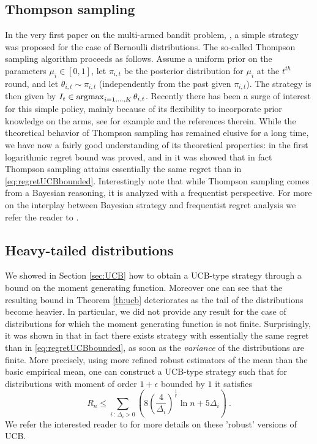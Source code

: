 \subsection{Thompson sampling}
In the very first paper on the multi-armed bandit problem, \cite{Tho33}, a simple strategy was proposed for the case of Bernoulli distributions. The so-called Thompson sampling algorithm proceeds as follows. Assume a uniform prior on the parameters $\mu_i \in [0,1]$, let $\pi_{i,t}$ be the posterior distribution for $\mu_i$ at the $t^{th}$ round, and let $\theta_{i,t} \sim \pi_{i,t}$ (independently from the past given $\pi_{i,t}$). The strategy is then given by $I_t \in \mathop{\mathrm{argmax}}_{i =1,\hdots, K} \theta_{i,t}$. Recently there has been a surge of interest for this simple policy, mainly because of its flexibility to incorporate prior knowledge on the arms, see for example \cite{CLi11} and the references therein. While the theoretical behavior of Thompson sampling has remained elusive for a long time, we have now a fairly good understanding of its theoretical properties: in \cite{AG12} the first logarithmic regret bound was proved, and in \cite{KKM12} it was showed that in fact Thompson sampling attains essentially the same regret than in \eqref{eq:regretUCBbounded}. Interestingly note that while Thompson sampling comes from a Bayesian reasoning, it is analyzed with a frequentist perspective. For more on the interplay between Bayesian strategy and frequentist regret analysis we refer the reader to \cite{KCG12}.

\subsection{Heavy-tailed distributions} \label{sec:heavytail}
We showed in Section \ref{sec:UCB} how to obtain a UCB-type strategy through a bound on the moment generating function. Moreover one can see that the resulting bound in Theorem \ref{th:ucb} deteriorates as the tail of the distributions become heavier. In particular, we did not provide any result for the case of distributions for which the moment generating function is not finite. Surprisingly, it was shown in \cite{BCL12} that in fact there exists strategy with essentially the same regret than in \eqref{eq:regretUCBbounded}, as soon as the {\em variance} of the distributions are finite. More precisely, using more refined robust estimators of the mean than the basic empirical mean, one can construct a UCB-type strategy such that for distributions with moment of order $1+\epsilon$ bounded by $1$ it satisfies
\[
R_n \leq \sum_{i \,:\, \Delta_i > 0} \left(8 \left(\frac{4}{\Delta_i}\right)^{\frac{1}{\epsilon}} \ln n + 5\Delta_i\right)~.
\]
We refer the interested reader to \cite{BCL12} for more details on these 'robust' versions of UCB.
